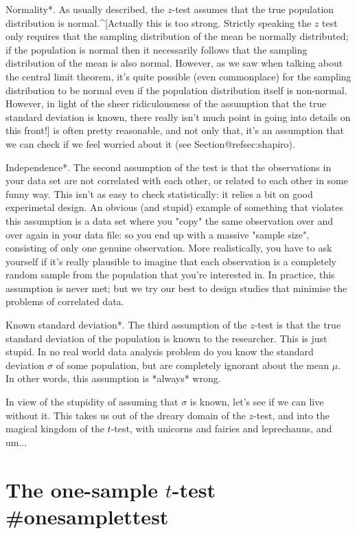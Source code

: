 \item *Normality*. As usually described, the $z$-test assumes that the true population distribution is normal.^[Actually this is too strong. Strictly speaking the $z$ test only requires that the sampling distribution of the mean be normally distributed; if the population is normal then it necessarily follows that the sampling distribution of the mean is also normal. However, as we saw when talking about the central limit theorem, it's quite possible (even commonplace) for the sampling distribution to be normal even if the population distribution itself is non-normal. However, in light of the sheer ridiculousness of the assumption that the true standard deviation is known, there really isn't much point in going into details on this front!] is often pretty reasonable, and not only that, it's an assumption that we can check if we feel worried about it (see Section@refsec:shapiro). 
\item *Independence*. The second assumption of the test is that the observations in your data set are not correlated with each other, or related to each other in some funny way. This isn't as easy to check statistically: it relies a bit on good experimetal design. An obvious (and stupid) example of something that violates this assumption is a data set where you "copy" the same observation over and over again in your data file: so you end up with a massive "sample size", consisting of only one genuine observation. More realistically, you have to ask yourself if it's really plausible to imagine that each observation is a completely random sample from the population that you're interested in. In practice, this assumption is never met; but we try our best to design studies that minimise the problems of correlated data. 
\item *Known standard deviation*. The third assumption of the $z$-test is that the true standard deviation of the population is known to the researcher. This is just stupid. In no real world data analysis problem do you know the standard deviation $\sigma$ of some population, but are completely ignorant about the mean $\mu$. In other words, this assumption is *always* wrong. 

In view of the stupidity of assuming that $\sigma$ is known, let's see if we can live without it. This takes us out of the dreary domain of the $z$-test, and into the magical kingdom of the $t$-test, with unicorns and fairies and leprechauns, and um...

\section{The one-sample $t$-test {#onesamplettest}}

